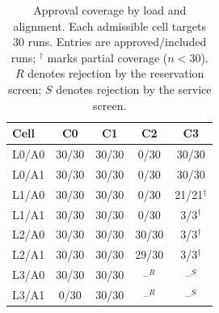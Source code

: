 \begin{table}[t]
\centering
\caption{Approval coverage by load and alignment. Each admissible cell targets 30 runs. Entries are approved/included runs; $^{\dagger}$ marks partial coverage ($n<30$). $R$ denotes rejection by the reservation screen; $S$ denotes rejection by the service screen.}
\label{tab:viability}
\footnotesize
\setlength{\tabcolsep}{3.5pt}
\begin{tabular}{@{}lcccc@{}}
\toprule
Cell & C0 & C1 & C2 & C3 \\
\midrule
L0/A0 & 30/30 & 30/30 & 0/30 & 30/30 \\
L0/A1 & 30/30 & 30/30 & 0/30 & 30/30 \\
L1/A0 & 30/30 & 30/30 & 0/30 & 21/21$^{\dagger}$ \\
L1/A1 & 30/30 & 30/30 & 0/30 & 3/3$^{\dagger}$ \\
L2/A0 & 30/30 & 30/30 & 30/30 & 3/3$^{\dagger}$ \\
L2/A1 & 30/30 & 30/30 & 29/30 & 3/3$^{\dagger}$ \\
L3/A0 & 30/30 & 30/30 & --$^{R}$ & --$^{S}$ \\
L3/A1 & 0/30 & 30/30 & --$^{R}$ & --$^{S}$ \\
\bottomrule
\end{tabular}
\end{table}
